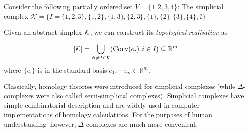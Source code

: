 \documentclass[11pt,a4paper]{report}
\begin{document}
            \begin{Ex}
              Consider the following partially ordered set  $ V = \{1, 2, 3, 4\}$: 
              The simplicial complex 
              $\mathcal{K} = \{I = \{1, 2, 3\}, \{1, 2\}, \{1, 3\}, \{2, 3\}, \{1\}, \{2\}, \{3\}, \{4\}, \emptyset\}$
             
             \begin{center}
              

             
             \end{center}
             
             Given an abstract simplex $\mathcal{K}$, we can construct its
             \emph{topological realisation}  as
             
              \[|\mathcal{K}| = \underset{\varnothing \neq I\in \mathcal{K} }{\bigcup} (\textrm{Conv}(e_i),i\in I)\subseteq \mathbb{R}^m\] 
              where $\{e_i\}$ is in the standard basis $e_1, \cdots e_m \in \mathbb{R}^m$. 
            \end{Ex}
            
            
            Classically, homology theories were introduced for simplicial complexes (while $\Delta$-complexes were also called semi-simplicial complexes).
            Simplicial complexes have simple combinatorial description and are widely used in computer implementations of homology calculations. For the purposes of human 
            understanding, however, $\Delta$-complexes are much more convenient.
            
\end{document}
